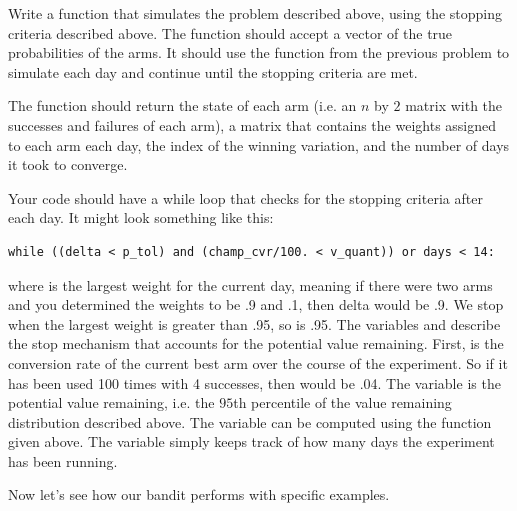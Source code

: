 \begin{problem}
Write a function that simulates the problem described above, using the stopping criteria described above.
The function should accept a vector of the true probabilities of the arms.  
It should use the function from the previous problem to simulate each day and 
continue until the stopping criteria are met.

The function should return the state of each arm (i.e. an $n$ by $2$ matrix with the 
successes and failures of each arm), a matrix that contains the weights assigned to 
each arm each day, the index of the winning variation, and the number of days it took to converge.

Your code should have a while loop that checks for the stopping criteria after each day.  
It might look something like this:
\begin{lstlisting}
while ((delta < p_tol) and (champ_cvr/100. < v_quant)) or days < 14:
\end{lstlisting}
where  is the largest weight for the current day, meaning if there were two arms and you determined the weights to be .9 and .1, then delta would be .9.  We stop when the largest weight is greater than .95, so  is .95.  The variables  and  describe the stop mechanism that accounts for the potential value remaining.  First,  is the conversion rate of the current best arm over the course of the experiment.  So if it has been used 100 times with 4 successes, then  would be .04.  The variable  is the potential value remaining, i.e. the $95$th percentile of the value remaining distribution described above.  The variable  can be computed using the  function given above.
The  variable simply keeps track of how many days the experiment has been running.
\end{problem}

Now let's see how our bandit performs with specific examples.

